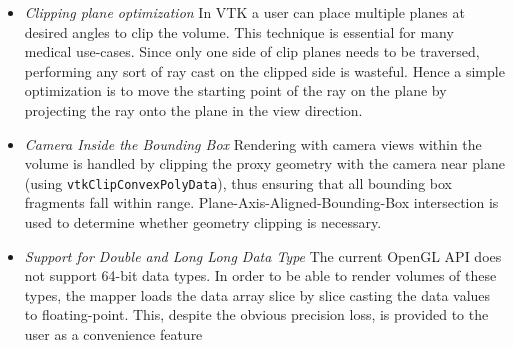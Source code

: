 \begin{itemize}
  \item \emph{Clipping plane optimization} In VTK a user can place multiple planes at
    desired angles to clip the volume. This technique is essential for many
    medical use-cases. Since only one side of clip planes needs to be traversed,
    performing any sort of ray cast on the clipped side is wasteful. Hence a
    simple optimization is to move the starting point of the ray on the plane by
    projecting the ray onto the plane in the view direction.
  \item \emph{Camera Inside the Bounding Box} Rendering with camera views within
    the volume is handled by clipping the proxy geometry with the camera near plane
    (using \texttt{vtkClipConvexPolyData}), thus ensuring that all
    bounding box fragments fall within range.
    Plane-Axis-Aligned-Bounding-Box intersection is used to determine whether
    geometry clipping is necessary.
  \item \emph{Support for Double and Long Long Data Type} The current OpenGL API does not
    support 64-bit data types. In order to be able to render volumes of these
    types, the mapper loads the data array slice by slice casting the data
    values to floating-point. This, despite the obvious precision loss, is
    provided to the user as a convenience feature
\end{itemize}